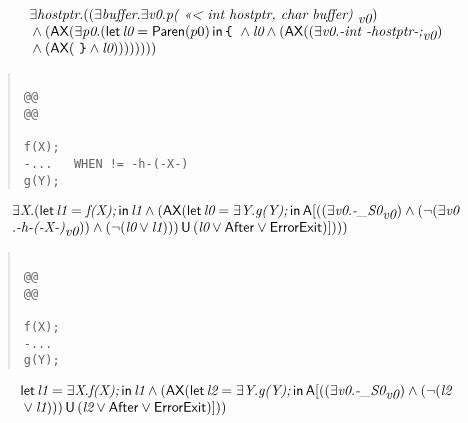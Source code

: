 \documentclass{article}
\newcommand{\U}{\,\mbox{\sf{U}}\,}
\newcommand{\A}{\mbox{\sf{A}}}
\newcommand{\AX}{\mbox{\sf{AX}}}
\newcommand{\mita}[1]{\mbox{\it{{#1}}}}
\newcommand{\msf}[1]{\mbox{\sf{{#1}}}}
\newcommand{\ttlb}{\mbox{\tt \char'173}}
\newcommand{\ttrb}{\mbox{\tt \char'175}}
\begin{document}
\[\begin{array}{l}
\exists \mita{hostptr} . ((\exists \mita{buffer} . \exists \mita{v0} . \mita{p(
    <<< int hostptr, 
  char buffer) }_{\mita{v0}})\\\mbox{} \wedge (\AX(\exists \mita{p0} . (\mita{\sf{let}} \, \mita{l0} = \msf{Paren}(p0) \, \mita{\sf{in}} \, \mita{{\ttlb}
  } \wedge \mita{l0} \wedge (\AX((\exists \mita{v0} . \mita{-int -hostptr-;}_{\mita{v0}})\\\mbox{} \wedge (\AX(\mita{
{\ttrb}} \wedge \mita{l0}))))
))))
\end{array}\]

\begin{quote}\begin{verbatim}

@@
@@

f(X);
-...   WHEN != -h-(-X-)
g(Y);
\end{verbatim}\end{quote}

\[\begin{array}{l}
\exists \mita{X} . (\mita{\sf{let}} \, \mita{l1} = \mita{f(X);} \, \mita{\sf{in}} \, \mita{l1} \wedge (\AX(\mita{\sf{let}} \, \mita{l0} = \exists \mita{Y} . \mita{g(Y);} \, \mita{\sf{in}} \, \A[((\exists \mita{v0} . \mita{-\_S0}_{\mita{v0}}) \wedge (\neg (\exists \mita{v0}\\\mbox{} . \mita{-h-(-X-)}_{\mita{v0}})) \wedge (\neg (\mita{l0} \vee \mita{l1}))) \U (\mita{l0} \vee \msf{After} \vee \msf{ErrorExit})]

))
)
\end{array}\]

\begin{quote}\begin{verbatim}

@@
@@

f(X);
-...
g(Y);
\end{verbatim}\end{quote}

\[\begin{array}{l}
\mita{\sf{let}} \, \mita{l1} = \exists \mita{X} . \mita{f(X);} \, \mita{\sf{in}} \, \mita{l1} \wedge (\AX(\mita{\sf{let}} \, \mita{l2} = \exists \mita{Y} . \mita{g(Y);} \, \mita{\sf{in}} \, \A[((\exists \mita{v0} . \mita{-\_S0}_{\mita{v0}}) \wedge (\neg (\mita{l2}\\\mbox{} \vee \mita{l1}))) \U (\mita{l2} \vee \msf{After} \vee \msf{ErrorExit})]

))

\end{array}\]
\end{document}
